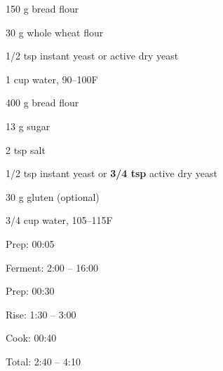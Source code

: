 \documentclass[oneside]{book}  %
\newcommand{\degF}{\textdegree F\xspace}
\begin{document}
\begin{IT}[0.753]
  \begin{ingredients}
    \item[150 g] bread flour
    \item[30 g] whole wheat flour
    \item[1/2 tsp] instant yeast or active dry yeast
    \item[1 cup] water, 90--100\degF
  \end{ingredients}
  \begin{ingredients}
    \item[400 g] bread flour
    \item[13 g] sugar
    \item[2 tsp] salt
    \item[1/2 tsp] instant yeast or \textbf{3/4 tsp} active dry yeast
    \item[30 g] gluten (optional)
    \item[3/4 cup] water, 105--115\degF
  \end{ingredients}

  \switchcolumn

  \begin{timeline}
    \item[Prep:]  00:05
    \item[Ferment:]  2:00 -- 16:00
  \end{timeline}
  \begin{timeline}
    \item[Prep:] 00:30
    \item[Rise:] 1:30 -- 3:00
    \item[Cook:] 00:40
    \item[Total:] 2:40 -- 4:10
  \end{timeline}
\end{IT}
\end{document}
